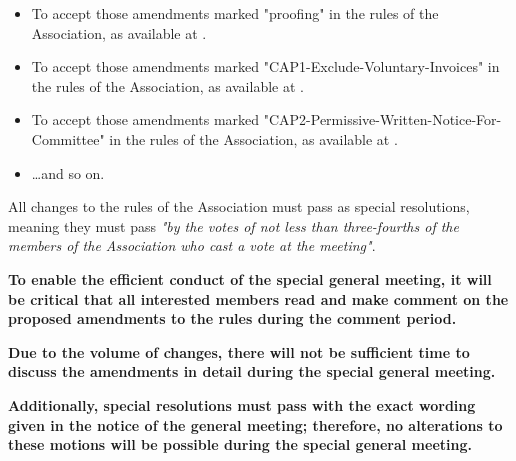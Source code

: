\documentclass[../constitution.tex]{subfiles}
\begin{document}
\begin{itemize}
    \item To accept those amendments marked "proofing" in the rules of the Association, as available at .
    \item To accept those amendments marked "CAP1-Exclude-Voluntary-Invoices" in the rules of the Association, as available at .
    \item To accept those amendments marked "CAP2-Permissive-Written-Notice-For-Committee" in the rules of the Association, as available at .
    \item \dots and so on.
\end{itemize}

All changes to the rules of the Association must pass as special resolutions, meaning they must pass \textit{"by the votes of not less than three-fourths of the members of the Association who cast a vote at the meeting"}.

\bigskip

\textbf{To enable the efficient conduct of the special general meeting, it will be critical that all interested members read and make comment on the proposed amendments to the rules during the comment period.}

\textbf{Due to the volume of changes, there will not be sufficient time to discuss the amendments in detail during the special general meeting.}

\textbf{Additionally, special resolutions must pass with the exact wording given in the notice of the general meeting; therefore, no alterations to these motions will be possible during the special general meeting.}
\end{document}
